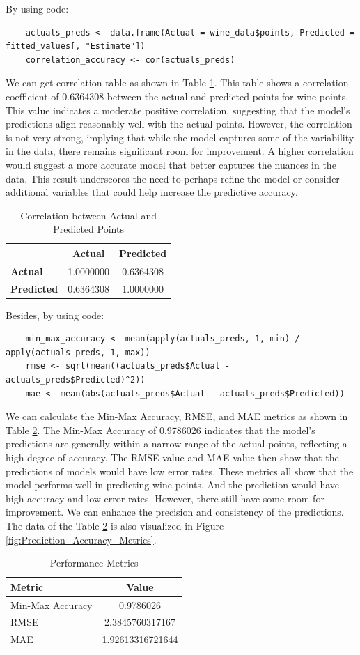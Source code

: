 \documentclass{article}
\begin{document}
By using code:
\begin{verbatim}
	actuals_preds <- data.frame(Actual = wine_data$points, Predicted = fitted_values[, "Estimate"])
	correlation_accuracy <- cor(actuals_preds)
\end{verbatim}
We can get correlation table as shown in Table \ref{table:correlation}. This table shows a correlation coefficient of 0.6364308 between the actual and predicted points for wine points. This value indicates a moderate positive correlation, suggesting that the model's predictions align reasonably well with the actual points. However, the correlation is not very strong, implying that while the model captures some of the variability in the data, there remains significant room for improvement. A higher correlation would suggest a more accurate model that better captures the nuances in the data. This result underscores the need to perhaps refine the model or consider additional variables that could help increase the predictive accuracy.
\begin{table}[htbp]
	\centering
	\caption{Correlation between Actual and Predicted Points}
	\begin{tabular}{lcc}
	\hline
	 & \textbf{Actual} & \textbf{Predicted} \\
	\hline
	\textbf{Actual} & 1.0000000 & 0.6364308 \\
	\textbf{Predicted} & 0.6364308 & 1.0000000 \\
	\hline
	\end{tabular}
	\label{table:correlation}
\end{table}

Besides, by using code:
\begin{verbatim}
	min_max_accuracy <- mean(apply(actuals_preds, 1, min) / apply(actuals_preds, 1, max))
	rmse <- sqrt(mean((actuals_preds$Actual - actuals_preds$Predicted)^2))
	mae <- mean(abs(actuals_preds$Actual - actuals_preds$Predicted))
\end{verbatim}
We can calculate the Min-Max Accuracy, RMSE, and MAE metrics as shown in Table \ref{table:metrics}. The Min-Max Accuracy of 0.9786026 indicates that the model's predictions are generally within a narrow range of the actual points, reflecting a high degree of accuracy. The RMSE value and MAE value then show that the predictions of models would have low error rates.  These metrics all show that the model performs well in predicting wine points. And the prediction would have high accuracy and low error rates. However, there still have some room for improvement. We can enhance the precision and consistency of the predictions. The data of the Table \ref{table:metrics} is also visualized in Figure \ref{fig:Prediction_Accuracy_Metrics}.
\begin{table}[htbp]
	\caption{Performance Metrics}
	\centering
	\begin{tabular}{lc}
	\hline
	\textbf{Metric} & \textbf{Value} \\
	\hline
	Min-Max Accuracy & 0.9786026 \\
	RMSE & 2.3845760317167 \\
	MAE & 1.92613316721644 \\
	\hline
	\end{tabular}
	\label{table:metrics}
\end{table}
\end{document}
